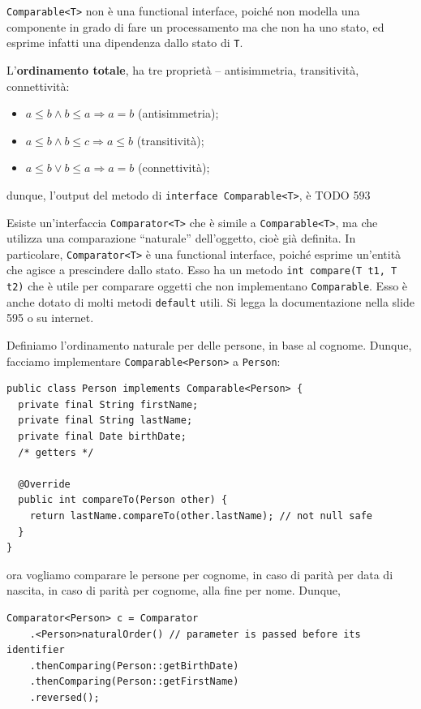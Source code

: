 \documentclass[\fontsizeclass,twocolumn]{\classname}
\theoremstyle{definition}
\theoremstyle{definition}
\begin{document}
\texttt{Comparable<T>} non è una functional interface, poiché non modella una
componente in grado di fare un processamento ma che non ha uno stato, ed
esprime infatti una dipendenza dallo stato di \texttt{T}.

L'\textbf{ordinamento totale}, ha tre proprietà -- antisimmetria, transitività,
connettività:

\begin{itemize}
    \item $a \leq b \wedge b \leq a \Rightarrow a = b$ (antisimmetria);
    \item $a \leq b \wedge b \leq c \Rightarrow a \leq b$ (transitività);
    \item $a \leq b \vee b \leq a \Rightarrow a = b$ (connettività);
\end{itemize}

dunque, l'output del metodo di \texttt{interface Comparable<T>}, è TODO 593

Esiste un'interfaccia \texttt{Comparator<T>} che è simile a
\texttt{Comparable<T>}, ma che utilizza una comparazione ``naturale''
dell'oggetto, cioè già definita. In particolare, \texttt{Comparator<T>} è una
functional interface, poiché esprime un'entità che agisce a prescindere dallo
stato. Esso ha un metodo \texttt{int compare(T t1, T t2)} che è utile per
comparare oggetti che non implementano \texttt{Comparable}. Esso è anche dotato
di molti metodi \texttt{default} utili. Si legga la documentazione nella slide
595 o su internet.

Definiamo l'ordinamento naturale per delle persone, in base al cognome. Dunque, facciamo implementare \texttt{Comparable<Person>} a \texttt{Person}:

\begin{lstlisting}
public class Person implements Comparable<Person> {
  private final String firstName;
  private final String lastName;
  private final Date birthDate;
  /* getters */
  
  @Override
  public int compareTo(Person other) {
    return lastName.compareTo(other.lastName); // not null safe
  }
}
\end{lstlisting}

ora vogliamo comparare le persone per cognome, in caso di parità per data di
nascita, in caso di parità per cognome, alla fine per nome. Dunque,

\begin{lstlisting}
Comparator<Person> c = Comparator
    .<Person>naturalOrder() // parameter is passed before its identifier
    .thenComparing(Person::getBirthDate)
    .thenComparing(Person::getFirstName)
    .reversed();
\end{lstlisting}
\end{document}
